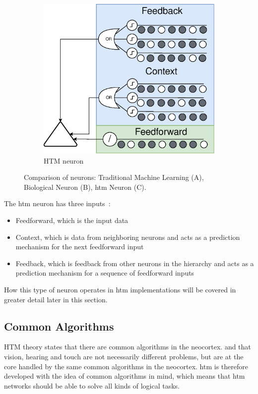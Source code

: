\begin{figure}[htb]
\begin{subfigure}[b]{0.55\linewidth}
        \includegraphics[width=\linewidth]{resources/related_works/neuron_htm}
        \caption[Comparison of neurons]{HTM neuron}
    \end{subfigure}
    \caption[Comparison of Neurons]{Comparison of neurons: Traditional Machine Learning (A), Biological Neuron (B), \gls*{htm} Neuron (C).}
    \label{fig:neuron_comparison}
\end{figure}
\par
The \gls*{htm} neuron has three inputs~\cite{htm_neurons}:
\begin{itemize}
    \item Feedforward, which is the input data
    \item Context, which is data from neighboring neurons and acts as a prediction mechanism for the next feedforward input
    \item Feedback, which is feedback from other neurons in the hierarchy and acts as a prediction mechanism for a sequence of feedforward inputs
\end{itemize}
How this type of neuron operates in \gls*{htm} implementations will be covered in greater detail later in this section.
\subsection{Common Algorithms}
HTM theory states that there are common algorithms in the neocortex. and that vision, hearing and touch are not necessarily different problems, but are at the core handled by the same common algorithms in the neocortex. \gls*{htm} is therefore developed with the idea of common algorithms in mind, which means that \gls*{htm} networks should be able to solve all kinds of logical tasks.
